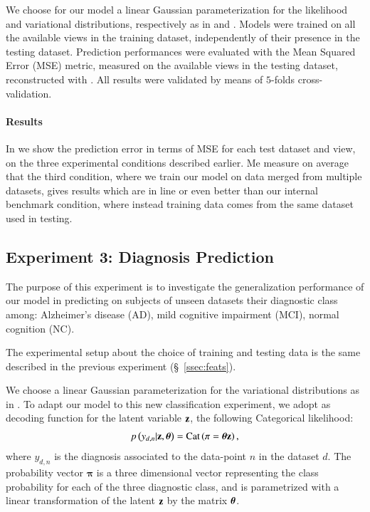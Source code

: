 We choose for our model a linear Gaussian parameterization for the likelihood and variational distributions, respectively as in  and .
Models were trained on all the available views in the training dataset, independently of their presence in the testing dataset.
Prediction performances were evaluated with the Mean Squared Error (MSE) metric, measured on the available views in the testing dataset, reconstructed with .
All results were validated by means of $5$-folds cross-validation.

\paragraph{Results}
In  we show the prediction error in terms of MSE for each test dataset and view, on the three experimental conditions described earlier.
Me measure on average that the third condition, where we train our model on data merged from multiple datasets, gives results which are in line or even better than our internal benchmark condition, where instead training data comes from the same dataset used in testing.

\subsection{Experiment 3: Diagnosis Prediction}


The purpose of this experiment is to investigate the generalization performance of our model in predicting on subjects of unseen datasets their diagnostic class among:
Alzheimer's disease (AD),
mild cognitive impairment (MCI),
normal cognition (NC).

The experimental setup about the choice of training and testing data is the same described in the previous experiment (\S~\ref{ssec:feats}).

We choose a linear Gaussian parameterization for the variational distributions as in .
To adapt our model to this new classification experiment, we adopt as decoding function for the latent variable $\mathbf{z}$, the following Categorical likelihood:
\begin{align}
\label{eq:classifier}
p\left(y_{d,n}|\mathbf{z},\boldsymbol{\theta}\right) = \operatorname{Cat}\left(\mathbf{\pi}=\boldsymbol{\theta}\mathbf{z}\right),
\end{align}
where $y_{d,n}$ is the diagnosis associated to the data-point $n$ in the dataset $d$.
The probability vector $\mathbf{\pi}$ is a three dimensional vector representing the class probability for each of the three diagnostic class, and is parametrized with a linear transformation of the latent $\mathbf{z}$ by the matrix $\boldsymbol{\theta}$.

